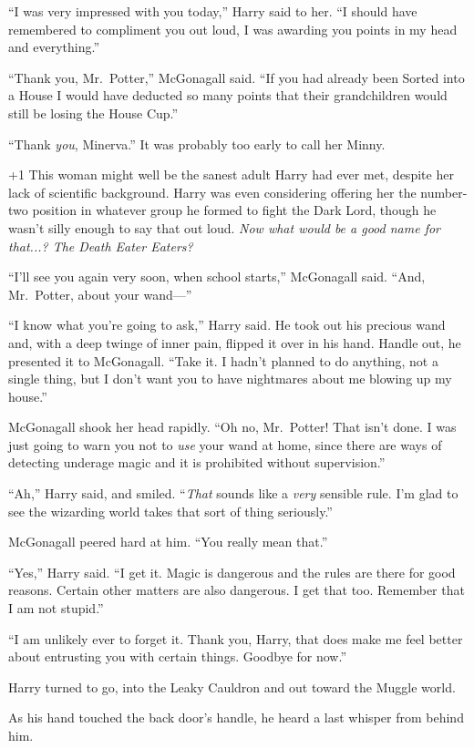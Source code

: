 “I was very impressed with you today,” Harry said to her. “I should have remembered to compliment you out loud, I was awarding you points in my head and everything.”

“Thank you, Mr.~Potter,” McGonagall said. “If you had already been Sorted into a House I would have deducted so many points that their grandchildren would still be losing the House Cup.”

“Thank \emph{you}, Minerva.” It was probably too early to call her Minny.

\looseness+1 This woman might well be the sanest adult Harry had ever met, despite her lack of scientific background. Harry was even considering offering her the number-two position in whatever group he formed to fight the Dark Lord, though he wasn’t silly enough to say that out loud. \emph{Now what would be a good name for that...? The Death Eater Eaters?}

“I’ll see you again very soon, when school starts,” McGonagall said. “And, Mr.~Potter, about your wand—”

“I know what you’re going to ask,” Harry said. He took out his precious wand and, with a deep twinge of inner pain, flipped it over in his hand. Handle out, he presented it to McGonagall. “Take it. I hadn’t planned to do anything, not a single thing, but I don’t want you to have nightmares about me blowing up my house.”

McGonagall shook her head rapidly. “Oh no, Mr.~Potter! That isn’t done. I was just going to warn you not to \emph{use} your wand at home, since there are ways of detecting underage magic and it is prohibited without supervision.”

“Ah,” Harry said, and smiled. “\emph{That} sounds like a \emph{very} sensible rule. I’m glad to see the wizarding world takes that sort of thing seriously.”

McGonagall peered hard at him. “You really mean that.”

“Yes,” Harry said. “I get it. Magic is dangerous and the rules are there for good reasons. Certain other matters are also dangerous. I get that too. Remember that I am not stupid.”

“I am unlikely ever to forget it. Thank you, Harry, that does make me feel better about entrusting you with certain things. Goodbye for now.”

Harry turned to go, into the Leaky Cauldron and out toward the Muggle world.

As his hand touched the back door’s handle, he heard a last whisper from behind him.

